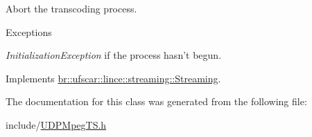 Abort the transcoding process. 


\begin{DoxyExceptions}{Exceptions}
\item[{\em InitializationException}]if the process hasn't begun. \end{DoxyExceptions}


Implements \hyperlink{classbr_1_1ufscar_1_1lince_1_1streaming_1_1Streaming_a6fa79a5e9bac37069e91d77be9ef4a54}{br::ufscar::lince::streaming::Streaming}.



The documentation for this class was generated from the following file:\begin{DoxyCompactItemize}
\item 
include/\hyperlink{UDPMpegTS_8h}{UDPMpegTS.h}\end{DoxyCompactItemize}
